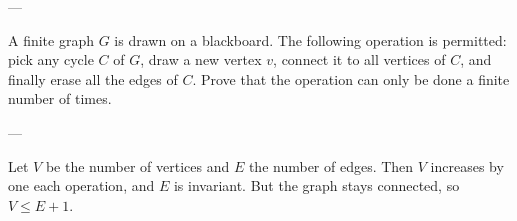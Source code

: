 
---

A finite graph $G$ is drawn on a blackboard. The following operation is permitted: pick any cycle $C$ of $G$, draw a new vertex $v$, connect it to all vertices of $C$, and finally erase all the edges of $C$. Prove that the operation can only be done a finite number of times.

---

Let $V$ be the number of vertices and $E$ the number of edges. Then $V$ increases by one each operation, and $E$ is invariant. But the graph stays connected, so $V\le E+1$.

